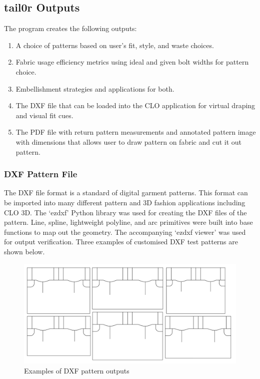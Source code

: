 
\subsection{tail0r Outputs}
The program creates the following outputs:
\begin{enumerate}
    \item A choice of patterns based on user's fit, style, and waste choices.
    \item Fabric usage efficiency metrics using ideal and given bolt widths for pattern choice.
    \item Embellishment strategies and applications for both.
    \item The DXF file that can be loaded into the CLO application for virtual draping and visual fit cues.
    \item The PDF file with return pattern measurements and annotated pattern image with dimensions that allows user to draw pattern on fabric and cut it out pattern.
\end{enumerate}

\subsubsection{DXF Pattern File}
The DXF file format is a standard of digital garment patterns. This format can be imported into many different pattern and 3D fashion applications including CLO 3D. The ‘ezdxf’ Python library was used for creating the DXF files of the pattern. Line, spline, lightweight polyline, and arc primitives were built into base functions to map out the geometry. The accompanying ‘ezdxf viewer’ was used for output verification. Three examples of customised DXF test patterns are shown below.

\begin{figure} [H] %
    \centering %
    \includegraphics[width = \textwidth]{Images/example dxfs.png} %
    \caption{Examples of DXF pattern outputs}
\end{figure}


